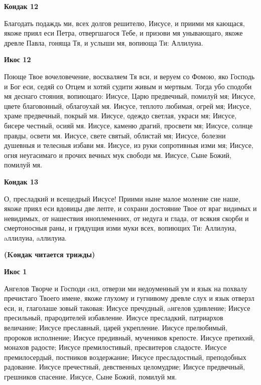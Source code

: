 \medskip


\bfseries Кондак 12\normalfont{}


Благодать подаждь ми, всех долгов решителю, Иисусе, и приими мя кающася, якоже приял еси Петра, отвергшагося Тебе, и призови мя унывающаго, якоже древле Павла, гоняща Тя, и услыши мя, вопиюща Ти: Аллилуиа.


\medskip


\bfseries Икос 12\normalfont{}


Поюще Твое вочеловечение, восхваляем Тя вси, и веруем со Фомою, яко Господь и Бог еси, седяй со Отцем и хотяй судити живым и мертвым. Тогда убо сподоби мя деснаго стояния, вопиющаго: Иисусе, Царю предвечный, помилуй мя; Иисусе, цвете благовонный, облагоухай мя. Иисусе, теплото любимая, огрей мя; Иисусе, храме предвечный, покрый мя. Иисусе, одеждо светлая, украси мя; Иисусе, бисере честный, осияй мя. Иисусе, каменю драгий, просвети мя; Иисусе, солнце правды, освети мя. Иисусе, свете святый, облистай мя; Иисусе, болезни душевныя и телесныя избави мя. Иисусе, из руки сопротивныя изми мя; Иисусе, огня неугасимаго и прочих вечных мук свободи мя. Иисусе, Сыне Божий, помилуй мя.


\medskip


\bfseries Кондак 13\normalfont{}


О, пресладкий и всещедрый Иисусе! Приими ныне малое моление сие наше, якоже приял еси вдовицы две лепте, и сохрани достояние Твое от враг видимых и невидимых, от нашествия иноплеменних, от недуга и глада, от всякия скорби и смертоносныя раны, и грядущия изми муки всех, вопиющих Ти: Аллилуиа, aллилуиа, aллилуиа.


\medskip


\bfseries (Kондак читается трижды)\normalfont{}


\medskip


\bfseries Икос 1\normalfont{}


Ангелов Творче и Господи cил, отверзи ми недоуменный ум и язык на похвалу пречистаго Твоего имене, якоже глухому и гугнивому древле слух и язык отверзл еси, и, глаголаше зовый таковая: Иисусе пречудный, aнгелов удивление; Иисусе пресильный, прародителей избавление. Иисусе пресладкий, патриархов величание; Иисусе преславный, царей укрепление. Иисусе прелюбимый, пророков исполнение; Иисусе предивный, мучеников крепосте. Иисусе претихий, монахов радосте; Иисусе премилостивый, пресвитеров сладосте. Иисусе премилосердый, постников воздержание; Иисусе пресладостный, преподобных радование. Иисусе пречестный, девственных целомудрие; Иисусе предвечный, грешников спасение. Иисусе, Сыне Божий, помилуй мя.


